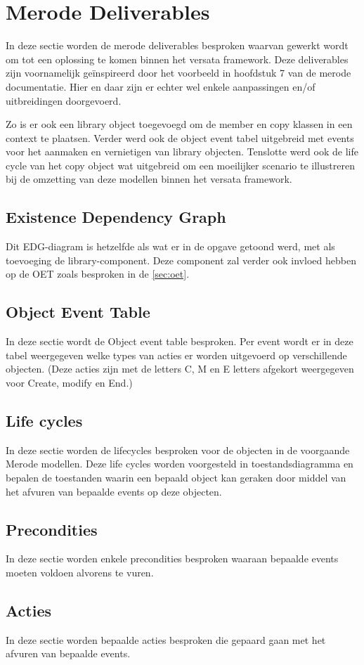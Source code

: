\section{Merode Deliverables}
In deze sectie worden de merode deliverables besproken waarvan gewerkt wordt om tot 
een oplossing te komen binnen het versata framework. Deze deliverables zijn voornamelijk
ge\"inspireerd door het voorbeeld in hoofdstuk 7 van de merode documentatie.
Hier en daar zijn er echter wel enkele aanpassingen en/of uitbreidingen doorgevoerd.

Zo is er ook een library object toegevoegd om de member en copy klassen in een context te plaatsen. Verder werd ook de object event tabel uitgebreid met events voor het aanmaken en vernietigen van library objecten. 
Tenslotte werd ook de life cycle van het copy object wat uitgebreid om een moeilijker scenario te illustreren bij de omzetting van deze modellen binnen het versata framework.
\subsection{Existence Dependency Graph}
Dit EDG-diagram is hetzelfde als wat er in de opgave getoond werd, met als toevoeging de
library-component. Deze component zal verder ook invloed hebben op de OET zoals besproken in de \ref{sec:oet}.
\subsection{Object Event Table}
In deze sectie wordt de Object event table besproken. Per event wordt er in deze tabel weergegeven
welke types van acties er worden uitgevoerd op verschillende objecten. (Deze acties zijn met de letters
C, M en E letters afgekort weergegeven voor Create, modify en End.)
\label{sec:oet}

\subsection{Life cycles}
In deze sectie worden de lifecycles besproken voor de objecten in de voorgaande Merode modellen.
Deze life cycles worden voorgesteld in toestandsdiagramma en bepalen de toestanden waarin een bepaald object kan geraken door middel van het afvuren van bepaalde events op deze objecten.

\subsection{Precondities}
In deze sectie worden enkele precondities besproken waaraan bepaalde events moeten voldoen alvorens te vuren.
\subsection{Acties}
In deze sectie worden bepaalde acties besproken die gepaard gaan met het afvuren van bepaalde events.

